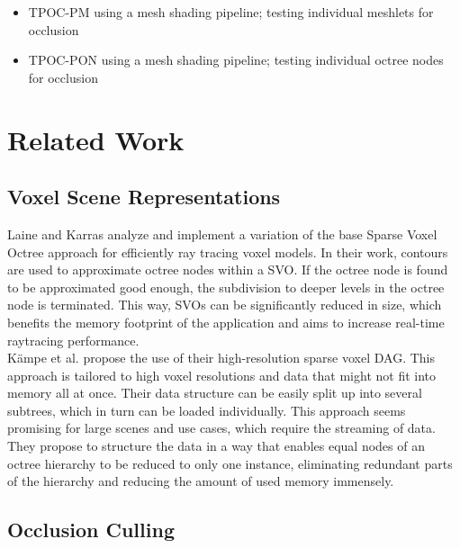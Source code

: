 \documentclass[conference]{IEEEtran}
\begin{document}
\begin{itemize}
    \item \ac{TPOC-PM} using a mesh shading pipeline; testing individual meshlets for occlusion 
    \item \ac{TPOC-PON} using a mesh shading pipeline; testing individual octree nodes for occlusion
\end{itemize}

\section{Related Work}

\subsection{Voxel Scene Representations} \label{subsec-voxel-scn-rep}

\noindent
Laine and Karras \cite{b6} analyze and implement a variation of the base Sparse Voxel Octree
approach for efficiently ray tracing voxel models. In their work, contours are used to
approximate octree nodes within a \ac{SVO}. If the octree node is found
to be approximated good enough, the subdivision to deeper levels in the octree node is
terminated. This way, \ac{SVO}s can be significantly reduced in size, which benefits the memory 
footprint of the application and aims to increase real-time raytracing performance. \\

\noindent
Kämpe et al. \cite{b2} propose the use of their high-resolution sparse voxel \ac{DAG}. 
This approach is tailored to high voxel resolutions and data that might not fit into 
memory all at once. Their data structure can be easily split up into several subtrees, 
which in turn can be loaded individually. This approach seems promising for large scenes 
and use cases, which require the streaming of data. They propose to structure the data in 
a way that enables equal nodes of an octree hierarchy to be reduced to only one instance, 
eliminating redundant parts of the hierarchy and reducing the amount of used memory immensely.

\subsection{Occlusion Culling} \label{subsec-occlusion-culling}
\end{document}
